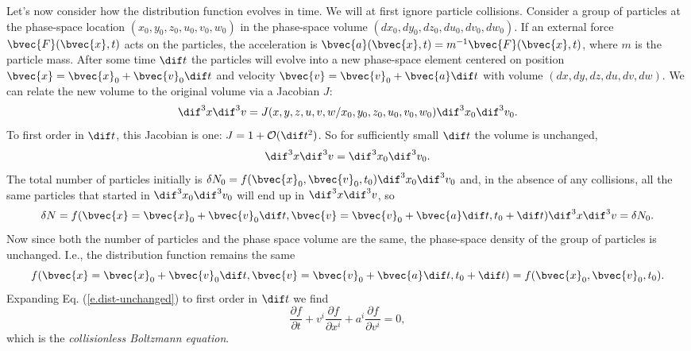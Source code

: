 Let's now consider how the distribution function evolves in time.
We will at first ignore particle collisions.
Consider a group of particles at the phase-space location $(x_0, y_0, z_0, u_0, v_0, w_0)$ in the phase-space volume $(dx_0, dy_0, dz_0, du_0, dv_0, dw_0)$.
If an external force $\bvec{F}(\bvec{x},t)$ acts on the particles, the acceleration is $\bvec{a}(\bvec{x},t)=m^{-1}\bvec{F}(\bvec{x},t)$, where $m$ is the particle mass.
After some time $\dif t$ the particles will evolve into a new phase-space element centered on position $\bvec{x}=\bvec{x}_0 + \bvec{v}_0\dif t$ and velocity $\bvec{v}=\bvec{v}_0 + \bvec{a}\dif t$ with volume $(dx, dy, dz, du, dv, dw)$.
We can relate the new volume to the original volume via a Jacobian $J$:
\begin{equation}
  \dif^3 x \dif^3 v = J(x,y,z,u,v,w/x_0,y_0,z_0,u_0,v_0,w_0) \dif^3x_0 \dif^3v_0.
\end{equation}
To first order in $\dif t$, this Jacobian is one: $J = 1 + \mathcal{O}(\dif t^2)$.
So for sufficiently small $\dif t$ the volume is unchanged,
\[
  \dif^3 x \dif^3 v = \dif^3x_0 \dif^3v_0.
\]
The total number of particles initially is $\delta N_0=f(\bvec{x}_0, \bvec{v}_0, t_0)\dif^3x_0 \dif^3v_0$ and, in the absence of any collisions, all the same particles that started in $\dif^3x_0 \dif^3v_0$ will end up in $\dif^3x \dif^3v$, so
\begin{equation}
  \delta N = f(\bvec{x}=\bvec{x}_0 + \bvec{v}_0\dif t, \bvec{v}=\bvec{v}_0 + \bvec{a}\dif t, t_0+\dif t)\dif^3 x \dif^3 v = \delta N_0.
\end{equation}
Now since both the number of particles and the phase space volume are the same, the phase-space density of the group of particles is unchanged. I.e., the distribution function remains the same
\begin{equation}
  f(\bvec{x}=\bvec{x}_0 + \bvec{v}_0\dif t, \bvec{v}=\bvec{v}_0 + \bvec{a}\dif t, t_0+\dif t) = f(\bvec{x}_0,\bvec{v}_0,t_0). \label{e.dist-unchanged}
\end{equation}
Expanding Eq. (\ref{e.dist-unchanged}) to first order in $\dif t$ we find
\begin{equation}
  \frac{\partial f}{\partial t} + v^i\frac{\partial f}{\partial x^i} + a^i \frac{\partial f}{\partial v^i} = 0, \label{e.CBE}
\end{equation}
which is the {\it collisionless Boltzmann equation}.

